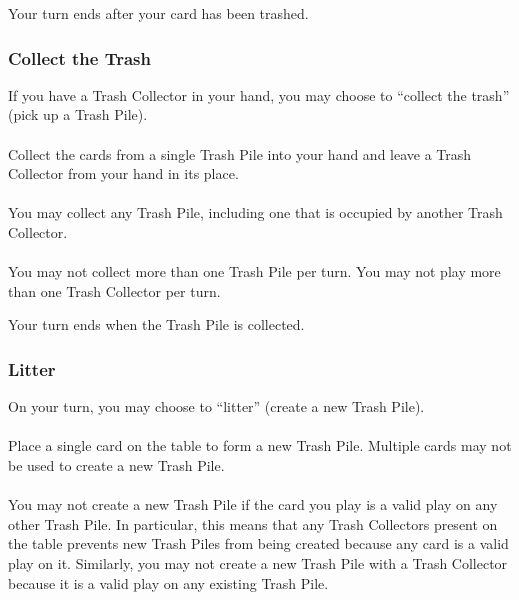 \documentclass{article}
\begin{document}
Your turn ends after your card has been trashed.

\subsubsection{Collect the Trash \label{sec:collect}}

If you have a Trash Collector in your hand, you may choose to ``collect the trash'' (pick up a Trash Pile).

\paragraph{\label{par:collectplay}}
Collect the cards from a single Trash Pile into your hand and leave a Trash Collector from your hand in its place.

\paragraph{\label{par:collectcollector}}
You may collect any Trash Pile, including one that is occupied by another Trash Collector.

\paragraph{\label{par:collectsingle}}
You may not collect more than one Trash Pile per turn. You may not play more than one Trash Collector per turn.

Your turn ends when the Trash Pile is collected.

\subsubsection{Litter \label{sec:litter}}

On your turn, you may choose to ``litter'' (create a new Trash Pile).

\paragraph{\label{par:littercreate}}
Place a single card on the table to form a new Trash Pile. Multiple cards may not be used to create a new Trash Pile.

\paragraph{\label{par:litterrestriction}}
You may not create a new Trash Pile if the card you play is a valid play on any other Trash Pile. In particular, this means that any Trash Collectors present on the table prevents new Trash Piles from being created because any card is a valid play on it. Similarly, you may not create a new Trash Pile with a Trash Collector because it is a valid play on any existing Trash Pile.
\end{document}
